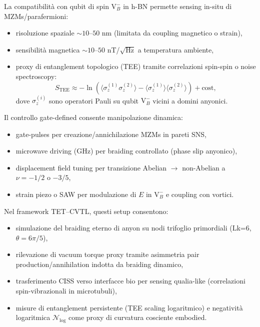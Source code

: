 \documentclass[11pt,a4paper]{article}
\theoremstyle{plain}
\theoremstyle{definition}
\begin{document}
La compatibilità con qubit di spin $\mathrm{V}_B^-$ in h-BN permette sensing in-situ di MZMs/parafermioni:
\begin{itemize}
    \item risoluzione spaziale $\sim 10$--$50$ nm (limitata da coupling magnetico o strain),
    \item sensibilità magnetica $\sim 10$--$50$ nT/$\sqrt{\text{Hz}}$ a temperatura ambiente,
    \item proxy di entanglement topologico (TEE) tramite correlazioni spin-spin o noise spectroscopy:
    \begin{equation}
    S_{\text{TEE}} \approx -\ln \left( \langle \sigma_z^{(1)} \sigma_z^{(2)} \rangle - \langle \sigma_z^{(1)} \rangle \langle \sigma_z^{(2)} \rangle \right) + \text{cost},
    \end{equation}
    dove $\sigma_z^{(i)}$ sono operatori Pauli su qubit $\mathrm{V}_B^-$ vicini a domini anyonici.
\end{itemize}

Il controllo gate-defined consente manipolazione dinamica:
\begin{itemize}
    \item gate-pulses per creazione/annichilazione MZMs in pareti SNS,
    \item microwave driving (GHz) per braiding controllato (phase slip anyonico),
    \item displacement field tuning per transizione Abelian $\to$ non-Abelian a $\nu = -1/2$ o $-3/5$,
    \item strain piezo o SAW per modulazione di $E$ in $\mathrm{V}_B^-$ e coupling con vortici.
\end{itemize}

Nel framework TET--CVTL, questi setup consentono:
\begin{itemize}
    \item simulazione del braiding eterno di anyon su nodi trifoglio primordiali (Lk=6, $\theta = 6\pi/5$),
    \item rilevazione di vacuum torque proxy tramite asimmetria pair production/annihilation indotta da braiding dinamico,
    \item trasferimento CISS verso interfacce bio per sensing qualia-like (correlazioni spin-vibrazionali in microtubuli),
    \item misure di entanglement persistente (TEE scaling logaritmico) e negatività logaritmica $\mathcal{N}_{\log}$ come proxy di curvatura cosciente embodied.
\end{itemize}
\end{document}
